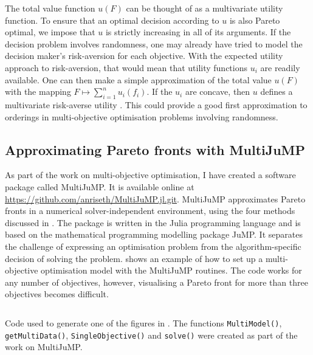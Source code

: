 \documentclass[main.tex]{subfiles}
\begin{document}
The total value function $u(F)$ can be thought of as a
multivariate utility function. To ensure that an optimal decision
according to $u$ is also Pareto optimal, we impose that $u$ is
strictly increasing in all of its arguments.
If the decision problem involves randomness, one may already have
tried to model the decision maker's risk-aversion for each objective.
With the expected utility approach to risk-aversion, that would mean
that utility functions $u_i$ are readily available. One can then make
a simple approximation of
the total value $u(F)$ with the mapping $F\mapsto \sum_{i=1}^n u_i(f_i)$.
If the $u_i$ are concave, then $u$ defines a multivariate risk-averse
utility \citep[Sec. 2.3.2]{campi2011multivariate}.
This could provide a good first approximation to orderings in
multi-objective optimisation problems involving randomness.


\subsection{Approximating Pareto fronts with
  MultiJuMP}\label{sec:one_multijump}
As part of the work on multi-objective optimisation, I have created a
software package called MultiJuMP.  It is available online at
\url{https://github.com/anriseth/MultiJuMP.jl.git}.  MultiJuMP
approximates Pareto fronts in a numerical solver-independent
environment, using the four methods discussed in
.  The package is written in the Julia
programming language and is based on the
mathematical programming modelling package JuMP. It separates the
challenge of expressing an
optimisation problem from the algorithm-specific decision of solving
the problem.  shows an example of how to set up a
multi-objective optimisation model with the MultiJuMP routines. The
code works for any number of objectives, however, visualising a Pareto
front for more than three objectives becomes difficult.
\begin{listing}[htbp]
  \inputminted{julia}{./include/multijump.jl}
  \caption{Code used to generate one of the figures in
    .
    The functions \texttt{MultiModel()},
    \texttt{getMultiData()},
    \texttt{SingleObjective()} and \texttt{solve()}
    were created as part of the work on MultiJuMP.
  }\label{lst:multijump}
\end{listing}


\biblio{} %
\end{document}
